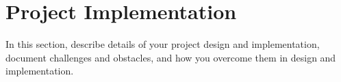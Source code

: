 \section{Project Implementation}
In this section, describe details of your project design and implementation, document challenges and obstacles, and how you overcome them in design and implementation. 
